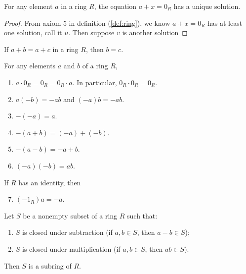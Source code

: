 \documentclass[../main.tex]{subfiles}
\begin{document}
\begin{theorem}
For any element $a$ in a ring $R$, the equation $a + x = 0_R$ has a unique solution.
\end{theorem}

\begin{proof}
From axiom 5 in definition (\ref{def:ring}), we know $a+x = 0_R$ has at least one solution, 
call it $u$. Then suppose $v$ is another solution 

\end{proof}



\begin{theorem}
If $a + b = a + c$ in a ring $R$, then $b = c$.
\end{theorem}




\begin{proposition}
For any elements $a$ and $b$ of a ring $R$,
\begin{enumerate}
    \item $a \cdot 0_R = 0_R = 0_R \cdot a$. In particular, $0_R \cdot 0_R = 0_R$.
    \item $a(-b) = -ab$ \quad and \quad $(-a)b = -ab$.
    \item $-(-a) = a$.
    \item $-(a + b) = (-a) + (-b)$.
    \item $-(a - b) = -a + b$.
    \item $(-a)(-b) = ab$.
\end{enumerate}
If $R$ has an identity, then
\begin{enumerate}
    \setcounter{enumi}{6}
    \item $(-1_R)a = -a$.
\end{enumerate}
\end{proposition}



\begin{proposition}[Subring]
Let $S$ be a nonempty subset of a ring $R$ such that:
\begin{enumerate}
    \item $S$ is closed under subtraction (if $a, b \in S$, then $a - b \in S$);
    \item $S$ is closed under multiplication (if $a, b \in S$, then $ab \in S$).
\end{enumerate}
Then $S$ is a subring of $R$.
\end{proposition}
\end{document}
